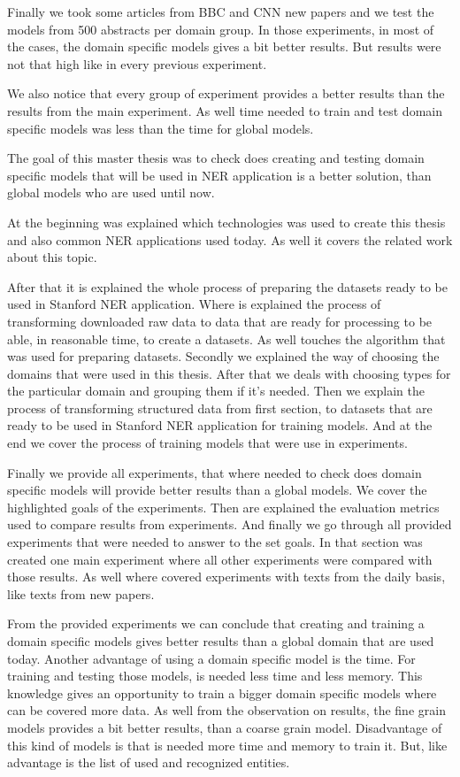 \documentclass[thesis=M,english]{FITthesis}[2018/05/30]
\begin{document}
Finally we took some articles from BBC and CNN new papers and we test the models from 500 abstracts per domain group. In those experiments, in most of the cases, the domain specific models gives a bit better results. But results were not that high like in every previous experiment.

We also notice that every group of experiment provides a better results than the results from the main experiment. As well time needed to train and test domain specific models was less than the time for global models. 



\begin{conclusion}
	The goal of this master thesis was to check does creating and testing domain specific models that will be used in NER application is a better solution, than global models who are used until now.
	
	At the beginning was explained which technologies was used to create this thesis and also common NER applications used today. As well it covers the related work about this topic.
	
	After that it is explained the whole process of preparing the datasets ready to be used in Stanford NER application. Where is explained the process of transforming downloaded raw data to data that are ready for processing to be able, in reasonable time, to create a datasets. As well touches the algorithm that was used for preparing datasets. Secondly we explained the way of choosing the domains that were used in this thesis. After that we deals with choosing types for the particular domain and grouping them if it's needed. Then we explain the process of transforming structured data from first section, to datasets that are ready to be used in Stanford NER application for training models. And at the end we cover the process of training models that were use in experiments.
	
	Finally we provide all experiments, that where needed to check does domain specific models will provide better results than a global models. We cover the highlighted goals of the experiments. Then are explained the evaluation metrics used to compare results from experiments. And finally we go through all provided experiments that were needed to answer to the set goals. In that section was created one main experiment where all other experiments were compared with those results. As well where covered experiments with texts from the daily basis, like texts from new papers.
	
	From the provided experiments we can conclude that creating and training a domain specific models gives better results than a global domain that are used today. Another advantage of using a domain specific model is the time. For training and testing those models, is needed less time and less memory. This knowledge gives an opportunity to train a bigger domain specific models where can be covered more data. As well from the observation on results, the fine grain models provides a bit better results, than a coarse grain model. Disadvantage of this kind of models is that is needed more time and memory to train it. But, like advantage is the list of used and recognized entities.
	

\end{conclusion}
\end{document}

